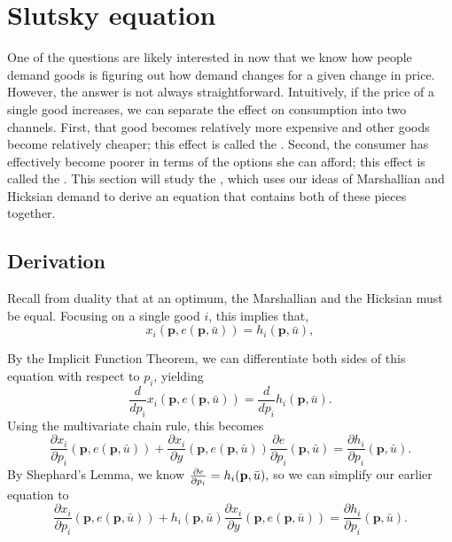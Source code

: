 \section{Slutsky equation} 
One of the questions are likely interested in now that we know how people demand goods is figuring out how demand changes for a given change in price. However, the answer is not always straightforward. Intuitively, if the price of a single good increases, we can separate the effect on consumption into two channels. First, that good becomes relatively more expensive and other goods become relatively cheaper; this effect is called the . Second, the consumer has effectively become poorer in terms of the options she can afford; this effect is called the . This section will study the , which uses our ideas of Marshallian and Hicksian demand to derive an equation that contains both of these pieces together.

\subsection*{Derivation}
Recall from duality that at an optimum, the Marshallian and the Hicksian must be equal. Focusing on a single good $i$, this implies that, 
$$x_{i}(\mathbf{p}, e(\mathbf{p}, \bar{u}))=h_{i}(\mathbf{p}, \bar{u}),$$

By the Implicit Function Theorem, we can differentiate both sides of this equation with respect to $p_i$, yielding 
$$\frac{d}{d p_{i}} x_{i}(\mathbf{p}, e(\mathbf{p}, \bar{u}))=\frac{d}{d p_{i}} h_{i}(\mathbf{p}, \bar{u}).$$
Using the multivariate chain rule, this becomes 
$$\frac{\partial x_{i}}{\partial p_{i}}(\mathbf{p}, e(\mathbf{p}, \bar{u}))+\frac{\partial x_{i}}{\partial y}(\mathbf{p}, e(\mathbf{p}, \bar{u})) \frac{\partial e}{\partial p_{i}}(\mathbf{p}, \bar{u})=\frac{\partial h_{i}}{\partial p_{i}}(\mathbf{p}, \bar{u}).$$
By Shephard's Lemma, we know $\pdv{e}{p_i}(\mathbf{p}, \bar{u})=h_{i}(\mathbf{p}, \bar{u}),$ so we can simplify our earlier equation to 
$$\frac{\partial x_{i}}{\partial p_{i}}(\mathbf{p}, e(\mathbf{p}, \bar{u}))+h_{i}(\mathbf{p}, \bar{u}) \frac{\partial x_{i}}{\partial y}(\mathbf{p}, e(\mathbf{p}, \bar{u}))=\frac{\partial h_{i}}{\partial p_{i}}(\mathbf{p}, \bar{u}).$$

